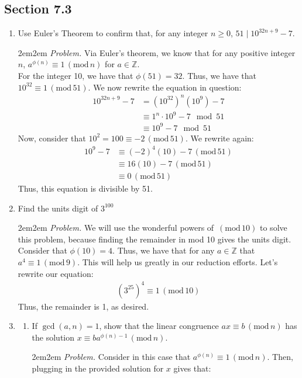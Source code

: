 \documentclass[10pt,oneside]{book}
\newcommand{\Z}{\mathbb{Z}}\newcommand{\R}{\mathbb{R}}\newcommand{\N}{\mathbb{N}}
\newcommand{\gspc}{\vspace{0.13cm}} %
\newcommand{\gline}{\gspc\\} %
\newcommand{\gmod}[1]{\,(\text{mod}\,#1)}
\let\endoldproof\endproof
\newenvironment{problem}[1]
  {\vspace{-0.1cm}\begin{coloredadjust}\begin{adjustwidth}{2em}{2em}
   \textit{Problem. }#1}
  {\endoldproof
\end{adjustwidth}\end{coloredadjust}\gspc}
\begin{document}
\subsection*{Section 7.3}
\begin{enumerate}
	\item [2.]Use Euler's Theorem to confirm that, for any integer $n\ge 0$, $51\mid 10^{32n+9}-7$. 
	\begin{problem}
		Via Euler's theorem, we know that for any positive integer $n$, $a^{\phi(n)} \equiv 1 \gmod{n}$ for $a\in\Z$. \gline
		For the integer 10, we have that $\phi(51) = 32$. Thus, we have that $10^32 \equiv 1 \gmod{51}$. We now rewrite the equation in question:
		\begin{align*}
			10^{32n+9}-7 &= (10^32)^{n}(10^9)-7\\
			&\equiv 1^n\cdot 10^9 - 7\mod 51\\
			&\equiv 10^9 - 7 \mod 51
		\end{align*}
		Now, consider that $10^2 = 100 \equiv -2\gmod{51}$. We rewrite again:
		\begin{align*}
			10^9 - 7 &\equiv (-2)^4 (10) - 7\gmod{51}\\
			&\equiv 16(10) - 7 \gmod{51}\\
			&\equiv 0 \gmod{51}
		\end{align*}
		Thus, this equation is divisible by 51. 
	\end{problem}
	\item [7.] Find the units digit of $3^{100}$
	\begin{problem}
		We will use the wonderful powers of $\gmod {10}$ to solve this problem, because finding the remainder in mod 10 gives the units digit.  Consider that $\phi(10) = 4$. Thus, we have that for any $a\in\Z$ that $a^4\equiv 1 \gmod {9}$. This will help us greatly in our reduction efforts. Let's rewrite our equation:
		\begin{align*}
			(3^{25})^4\equiv 1 \gmod {10}
		\end{align*}
		Thus, the remainder is 1, as desired.
	\end{problem}
	\pagebreak
	\item [8.] \begin{enumerate}
		\item If $\gcd(a,n)=1$, show that the linear congruence $ax\equiv b\gmod{n}$ has the solution $x\equiv ba^{\phi(n)-1}\gmod{n}$.
		\begin{problem}
			Consider in this case that $a^{\phi(n)}\equiv 1\gmod{n}$. Then, plugging in the provided solution for $x$ gives that:

\end{problem}
\end{enumerate}
\end{enumerate}
\end{document}
